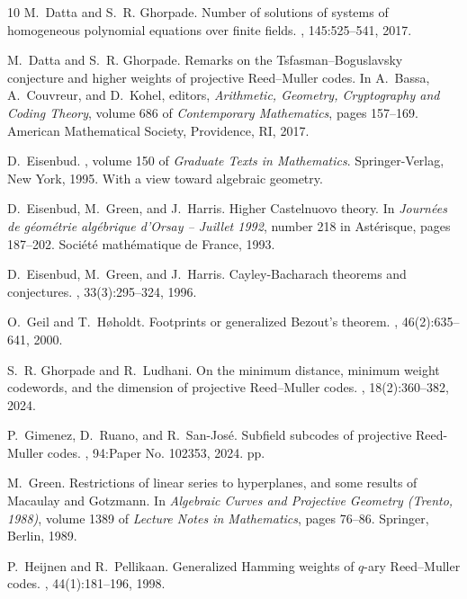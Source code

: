 \documentclass[11pt]{amsart}
\theoremstyle{definition}
\numberwithin{equation}{section}
\begin{document}
\begin{thebibliography}{10}
M.~Datta and S.~R. Ghorpade.
\newblock Number of solutions of systems of homogeneous polynomial equations over finite fields.
, 145:525--541, 2017.

M.~Datta and S.~R. Ghorpade.
\newblock Remarks on the {Tsfasman--Boguslavsky} conjecture and higher weights of projective {Reed--Muller} codes.
\newblock In A.~Bassa, A.~Couvreur, and D.~Kohel, editors, {\em Arithmetic, Geometry, Cryptography and Coding Theory}, volume 686 of {\em Contemporary Mathematics}, pages 157--169. American Mathematical Society, Providence, RI, 2017.

D.~Eisenbud.
, volume 150 of {\em Graduate Texts in Mathematics}.
\newblock Springer-Verlag, New York, 1995.
\newblock With a view toward algebraic geometry.

D.~Eisenbud, M.~Green, and J.~Harris.
\newblock Higher {Castelnuovo} theory.
\newblock In {\em Journ\'ees de g\'eom\'etrie alg\'ebrique d'Orsay -- Juillet 1992}, number 218 in Ast\'erisque, pages 187--202. Soci\'et\'e math\'ematique de France, 1993.

D.~Eisenbud, M.~Green, and J.~Harris.
\newblock Cayley-{B}acharach theorems and conjectures.
, 33(3):295--324, 1996.

O.~Geil and T.~H{\o}holdt.
\newblock Footprints or generalized {B}ezout's theorem.
, 46(2):635--641, 2000.

S.~R. Ghorpade and R.~Ludhani.
\newblock On the minimum distance, minimum weight codewords, and the dimension of projective {Reed--Muller} codes.
, 18(2):360--382, 2024.

P.~Gimenez, D.~Ruano, and R.~San-Jos\'{e}.
\newblock Subfield subcodes of projective {R}eed-{M}uller codes.
, 94:Paper No. 102353, 2024.
 pp.

M.~Green.
\newblock Restrictions of linear series to hyperplanes, and some results of {Macaulay} and {Gotzmann}.
\newblock In {\em Algebraic Curves and Projective Geometry (Trento, 1988)}, volume 1389 of {\em Lecture Notes in Mathematics}, pages 76--86. Springer, Berlin, 1989.

P.~Heijnen and R.~Pellikaan.
\newblock Generalized {Hamming} weights of {$q$}-ary {Reed--Muller} codes.
, 44(1):181--196, 1998.


\end{thebibliography}
\end{document}
